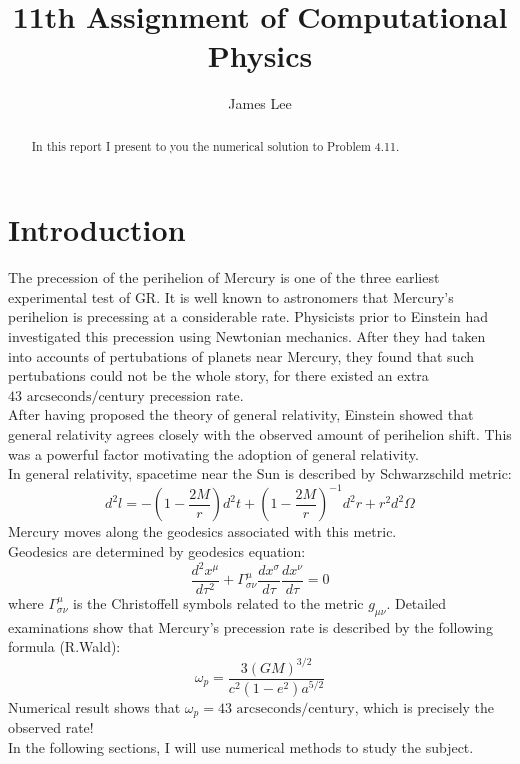 \documentclass[10pt,a4paper]{article}
\author{James Lee}
\title{11th Assignment of Computational Physics}
\begin{document}
	\maketitle
	\begin{abstract}
		In this report I present to you the numerical solution to Problem 4.11.
	\end{abstract}
	\section{Introduction}
	The precession of the perihelion of Mercury is one of the three earliest experimental test of GR. It is well known to astronomers that Mercury's perihelion is precessing at a considerable rate. Physicists prior to Einstein had investigated this precession using Newtonian mechanics. After they had taken into accounts of pertubations of planets near Mercury, they found that such pertubations could not be the whole story, for there existed an extra $43\text{ arcseconds/century}$ precession rate.\\
	After having proposed the theory of general relativity, Einstein showed that general relativity agrees closely with the observed amount of perihelion shift. This was a powerful factor motivating the adoption of general relativity.\\
	In general relativity, spacetime near the Sun is described by Schwarzschild metric:
	\begin{equation}
     d^{2}l=-(1-\frac{2M}{r})d^{2}t+(1-\frac{2M}{r})^{-1}d^{2}r+r^{2}d^{2}\Omega
    \end{equation}
	Mercury moves along the geodesics associated with this metric.\\
	Geodesics are determined by geodesics equation:
	\begin{equation}
	 \frac{d^{2}x^{\mu}}{d\tau^2}+\Gamma^{\mu}_{\sigma \nu}\frac{dx^{\sigma}}{d\tau}\frac{dx^{\nu}}{d\tau}=0
	\end{equation}
	where $\Gamma^{\mu}_{\sigma \nu}$ is the Christoffell symbols related to the metric $g_{\mu \nu}$.
	Detailed examinations show that Mercury's precession rate is described by the following formula (R.Wald):
	\begin{equation}
	\omega_p=\frac{3(GM)^{3/2}}{c^2(1-e^2)a^{5/2}}
	\end{equation}
	Numerical result shows that $\omega_p=43\text{ arcseconds/century}$, which is precisely the observed rate!\\
	In the following sections, I will use numerical methods to study the subject.
\end{document}
